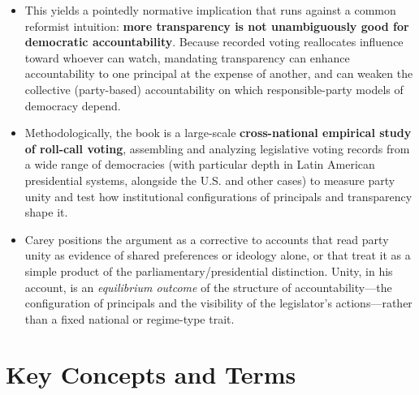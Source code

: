 \documentclass[12pt]{article}
\begin{document}
\begin{itemize}[leftmargin=*, itemsep=4pt]
    \item This yields a pointedly normative implication that runs against a common reformist intuition: \textbf{more transparency is not unambiguously good for democratic accountability}. Because recorded voting reallocates influence toward whoever can watch, mandating transparency can enhance accountability to one principal at the expense of another, and can weaken the collective (party-based) accountability on which responsible-party models of democracy depend.
    \item Methodologically, the book is a large-scale \textbf{cross-national empirical study of roll-call voting}, assembling and analyzing legislative voting records from a wide range of democracies (with particular depth in Latin American presidential systems, alongside the U.S. and other cases) to measure party unity and test how institutional configurations of principals and transparency shape it.
    \item Carey positions the argument as a corrective to accounts that read party unity as evidence of shared preferences or ideology alone, or that treat it as a simple product of the parliamentary/presidential distinction. Unity, in his account, is an \emph{equilibrium outcome} of the structure of accountability---the configuration of principals and the visibility of the legislator's actions---rather than a fixed national or regime-type trait.
\end{itemize}

\section{Key Concepts and Terms}
\end{document}
